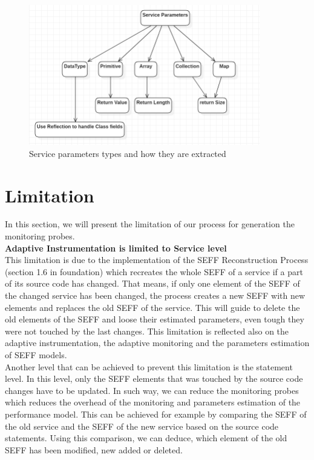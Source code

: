 \begin{figure}[h]
\centering
\includegraphics[width=0.9\textwidth]{figures/service_parameters}
\caption{Service parameters types and how they are extracted}
\label{fig:service_parameters}
\end{figure}


\section{Limitation}
\label{sec:Limitation}
In this section, we will present the limitation of our process for generation the monitoring probes.\\ 

\textbf{Adaptive Instrumentation is limited to Service level}\\
This limitation is due to the implementation of the SEFF Reconstruction Process (section 1.6 in  foundation) which recreates the whole SEFF of a service if a part of its source code has changed. That means, if only one element of the SEFF of the changed service has been changed, the process creates a new SEFF with new elements and replaces the old SEFF of the service. This will guide to delete the old elements of the SEFF and loose their estimated parameters, even tough they were not touched by the last changes. This limitation is reflected also on the adaptive instrumentation, the adaptive monitoring and the parameters estimation of SEFF models.\\ 

Another level that can be achieved to prevent this limitation is the statement level. In this level, only the SEFF elements that was touched by the source code changes have to be updated. In such way, we can reduce the monitoring probes which reduces the overhead of the monitoring and parameters estimation of the performance model. This can be achieved for example by comparing the SEFF of the old service and the SEFF of the new service based on the source code statements. Using this comparison, we can deduce, which element of the old SEFF has been modified, new added or deleted.  \\

